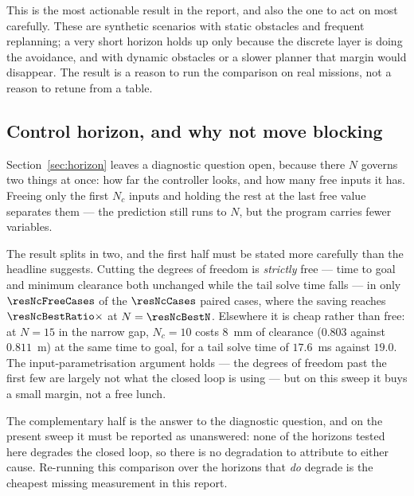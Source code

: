 \documentclass[11pt,a4paper]{article}
\newcommand{\Ninput}{N_c}
\begin{document}
This is the most actionable result in the report, and also the one to act on most carefully. These are
synthetic scenarios with static obstacles and frequent replanning; a very short horizon holds up only because
the discrete layer is doing the avoidance, and with dynamic obstacles or a slower planner that margin would
disappear. The result is a reason to run the comparison on real missions, not a reason to retune from a
table.

\subsection{Control horizon, and why not move blocking}
\label{sec:nc}

Section~\ref{sec:horizon} leaves a diagnostic question open, because there $N$ governs two things at once:
how far the controller looks, and how many free inputs it has. Freeing only the first $\Ninput$ inputs and
holding the rest at the last free value separates them --- the prediction still runs to $N$, but the program
carries fewer variables.

\begin{table}[htbp]
  \centering
  \small
  \caption{Closed-loop outcome against the control horizon at fixed prediction horizon.}
  \label{res:tab:nc}
\end{table}

The result splits in two, and the first half must be stated more carefully than the headline suggests.
Cutting the degrees of freedom is \emph{strictly} free --- time to goal and minimum clearance both unchanged
while the tail solve time falls --- in only $\resNcFreeCases$ of the $\resNcCases$ paired cases, where the
saving reaches $\resNcBestRatio\times$ at $N=\resNcBestN$. Elsewhere it is cheap rather than free: at
$N=15$ in the narrow gap, $\Ninput=10$ costs $8$~mm of clearance ($0.803$ against $0.811$~m) at the same time
to goal, for a tail solve time of $17.6$~ms against $19.0$. The input-parametrisation argument holds --- the
degrees of freedom past the first few are largely not what the closed loop is using --- but on this sweep it
buys a small margin, not a free lunch.

The complementary half is the answer to the diagnostic question, and on the present sweep it must be reported
as unanswered: none of the horizons tested here degrades the closed loop, so there is no degradation to
attribute to either cause. Re-running this comparison over the horizons that \emph{do} degrade is the
cheapest missing measurement in this report.
\end{document}
